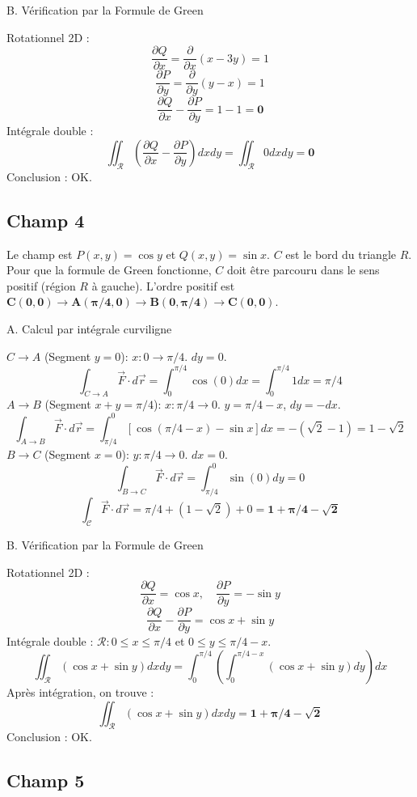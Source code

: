 \documentclass[french]{yLectureNote}
\renewcommand{\vec}{\overrightarrow}
\begin{document}
B. Vérification par la Formule de Green

Rotationnel 2D :
$$
\frac{\partial Q}{\partial x} = \frac{\partial}{\partial x}(x-3y) = 1
$$
$$
\frac{\partial P}{\partial y} = \frac{\partial}{\partial y}(y-x) = 1
$$
$$
\frac{\partial Q}{\partial x}-\frac{\partial P}{\partial y} = 1 - 1 = \mathbf{0}
$$
Intégrale double :
$$
\iint_{\mathcal{R}}\left(\frac{\partial Q}{\partial x} - \frac{\partial P}{\partial y}\right) dx dy = \iint_{\mathcal{R}} 0 dx dy = \mathbf{0}
$$
Conclusion : OK.


\subsection{Champ 4}

Le champ est $P(x,y)=\cos y$ et $Q(x,y)=\sin x$. $C$ est le bord du triangle $R$.
Pour que la formule de Green fonctionne, $C$ doit être parcouru dans le sens positif (région $R$ à gauche). L'ordre positif est $\mathbf{C(0,0) \to A(\pi/4, 0) \to B(0, \pi/4) \to C(0,0)}$.

A. Calcul par intégrale curviligne

$C \to A$ (Segment $y=0$): $x: 0 \to \pi/4$. $dy=0$.
    $$
    \int_{C \to A} \vec{F}\cdot d\vec{r} = \int_{0}^{\pi/4} \cos(0) dx = \int_{0}^{\pi/4} 1 dx = \pi/4
    $$
$A \to B$ (Segment $x+y=\pi/4$): $x: \pi/4 \to 0$. $y=\pi/4-x$, $dy=-dx$.
    $$
    \int_{A \to B} \vec{F}\cdot d\vec{r} = \int_{\pi/4}^{0} [\cos(\pi/4-x) - \sin x] dx = -\left( \sqrt{2}-1 \right) = 1 - \sqrt{2}
    $$
$B \to C$ (Segment $x=0$): $y: \pi/4 \to 0$. $dx=0$.
    $$
    \int_{B \to C} \vec{F}\cdot d\vec{r} = \int_{\pi/4}^{0} \sin(0) dy = 0
    $$
$$
\int_{\mathcal{C}}\vec{F}\cdot d\vec{r} = \pi/4 + (1 - \sqrt{2}) + 0 = \mathbf{1 + \pi/4 - \sqrt{2}}
$$

B.  Vérification par la Formule de Green

Rotationnel 2D :
$$
\frac{\partial Q}{\partial x} = \cos x, \quad \frac{\partial P}{\partial y} = -\sin y
$$
$$
\frac{\partial Q}{\partial x}-\frac{\partial P}{\partial y} = \cos x + \sin y
$$
Intégrale double : $\mathcal{R}: 0 \le x \le \pi/4$ et $0 \le y \le \pi/4 - x$.
$$
\iint_{\mathcal{R}} (\cos x + \sin y) dx dy = \int_{0}^{\pi/4} \left( \int_{0}^{\pi/4-x} (\cos x + \sin y) dy \right) dx
$$
Après intégration, on trouve :
$$
\iint_{\mathcal{R}} (\cos x + \sin y) dx dy = \mathbf{1 + \pi/4 - \sqrt{2}}
$$
Conclusion : OK.

\subsection{Champ 5}
\end{document}
